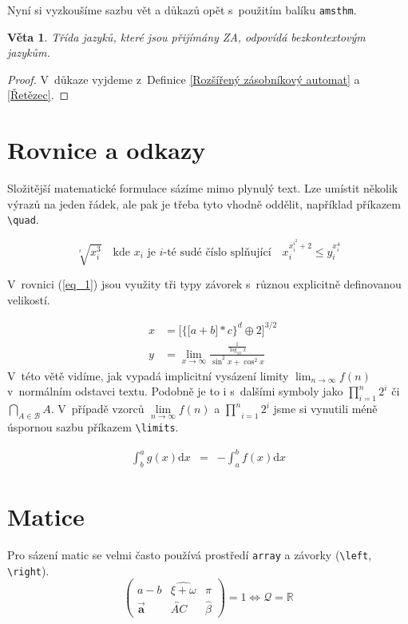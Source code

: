 \documentclass[a4paper, 11pt, twocolumn]{article}
\theoremstyle{definition}
\theoremstyle{plain}
\newtheorem{sentence}{Věta}
\begin{document}
        Nyní si vyzkoušíme sazbu vět a důkazů opět s~použitím balíku \verb+amsthm+.
        \begin{sentence}
            Třída jazyků, které jsou přijímány ZA, odpovídá bezkontextovým jazykům.
        \end{sentence}
        \begin{proof}
            V~důkaze vyjdeme z~Definice \ref{Rozšířený zásobníkový automat} a \ref{Řetězec}. 
        \end{proof}
        
    \section{Rovnice a odkazy}
        Složitější matematické formulace sázíme mimo plynulý text. Lze umístit několik výrazů na jeden řádek, ale pak je třeba tyto vhodně oddělit, například příkazem \verb+\quad+.
        
        \[
        \sqrt[i]{x_{i}^{3}} \quad \textrm{kde }x_{i} \textrm{ je }i\textrm{-té sudé číslo splňující} \quad x_{i}^{x_{i}^{i^{2}}+2} \leq y_{i}^{x_{i}^{4}} 
        \]
        
        V~rovnici (\ref{eq_1}) jsou využity tři typy závorek s~různou explicitně definovanou velikostí.  
        
        \begin{eqnarray}
            \label{eq_1}
            & x &=\bigg[\Big\{ \big[a+b\big] * c\Big\}^d \oplus 2\bigg]^{3 / 2}\\
            & y &=\lim _{x \rightarrow \infty} \frac{\frac{1}{\log _{10} x}}{\sin ^{2} x+\cos ^{2} x} \nonumber
        \end{eqnarray}
        V~této větě vidíme, jak vypadá implicitní vysázení limity $\lim _{n \rightarrow \infty} f(n)$ v~normálním odstavci textu. Podobně je to i s~dalšími symboly jako $\prod_{i=1}^{n} 2^{i}$ či $\bigcap_{A \in \mathcal{B}} A$. V~případě vzorců $\underset{n \rightarrow \infty}{\lim} f(n)$ a $\underset{i=1}{\stackrel{n}{\prod}}2^{i}$ jsme si vynutili méně úspornou sazbu příkazem \verb+\limits+.
        
        \begin{eqnarray}
            \label{eq_2}
            \int_{b}^{a} g(x) \mathrm{d} x&=&-\int_{a}^{b} f(x) \mathrm{d} x
        \end{eqnarray}
    
    \section{Matice}
        Pro sázení matic se velmi často používá prostředí \verb+array+ a závorky (\verb+\left+, \verb+\right+).
        $$
        \left(\begin{array}{ccc}a-b & \widehat{\xi+\omega} & \pi \\ \vec{\mathbf{a}} & \overleftrightarrow{AC} & \hat{\beta}\end{array}\right)=1 \Longleftrightarrow \mathcal{Q}=\mathbb{R} \nonumber
        $$
        
\end{document}
